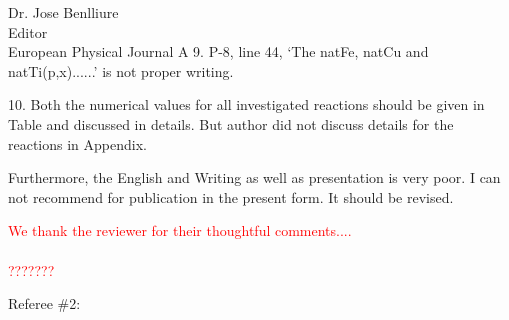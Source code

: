 \documentclass{letter} %
\newcommand{\colornote}[1]{\textcolor{red}{#1}}
\begin{document}
\begin{letter}{Dr. Jose Benlliure \\
Editor \\
European Physical Journal A}
9. P-8, line 44, ‘The natFe, natCu and natTi(p,x)......’ is not proper writing.

10. Both the numerical values for all investigated reactions should be given in Table and discussed in
details. But author did not discuss details for the reactions in Appendix.

Furthermore, the English and Writing as well as presentation is very poor. I can not recommend for
publication in the present form. It should be revised.

 \colornote{We thank the reviewer for their thoughtful comments....\\\\ ???????}




 
 
\pagebreak


 Referee \#2:




\end{letter}
\end{document}
